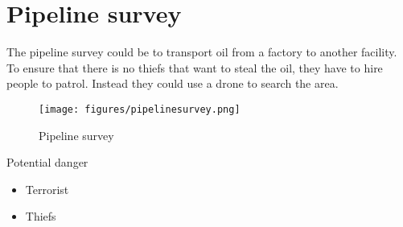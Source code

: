 \section{Pipeline survey}
The pipeline survey could be to transport oil from a factory to another facility. To ensure that there is no thiefs that want to steal the oil, they have to hire people to patrol. Instead they could use a drone to search the area.
\begin{figure}[hb]
  \centering
  \texttt{[image: figures/pipelinesurvey.png]}
  \caption[Pipeline survey]
   {Pipeline survey}
\end{figure}
Potential danger
\begin{itemize}
\item Terrorist
\item Thiefs
\end{itemize}